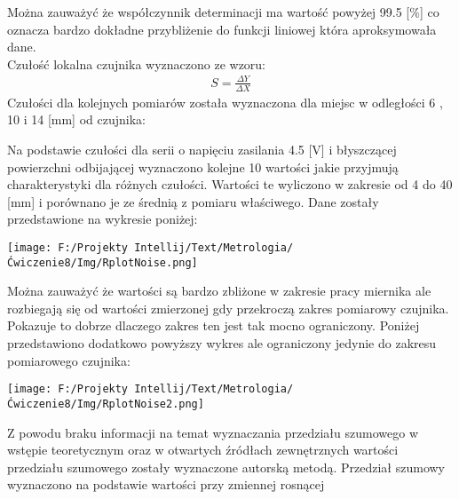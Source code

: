 \documentclass[11pt]{article}
\begin{document}
    \indent Można zauważyć że współczynnik determinacji ma wartość powyżej 99.5 [\%] co oznacza bardzo dokładne przybliżenie do funkcji
    liniowej która aproksymowała dane.\\
    \indent Czułość lokalna czujnika wyznaczono ze wzoru:
    \begin{gather*}
        S=\frac{\Delta Y}{\Delta X}
    \end{gather*}
    \indent Czułości dla kolejnych pomiarów została wyznaczona dla miejsc w odległości 6 , 10 i 14 [mm] od czujnika:
    \begin{center}
    \end{center}
    \par Na podstawie czułości dla serii o napięciu zasilania 4.5 [V] i błyszczącej powierzchni odbijającej wyznaczono kolejne 10 wartości jakie
    przyjmują charakterystyki dla różnych czułości. Wartości te wyliczono w zakresie od 4 do 40 [mm] i porównano je ze średnią z pomiaru właściwego.
    Dane zostały przedstawione na wykresie poniżej:
    \begin{center}
        \texttt{[image: F:/Projekty Intellij/Text/Metrologia/Ćwiczenie8/Img/RplotNoise.png]}
    \end{center}
    \par Można zauważyć że wartości są bardzo zbliżone w zakresie pracy miernika ale rozbiegają się od wartości zmierzonej gdy przekroczą zakres
    pomiarowy czujnika. Pokazuje to dobrze dlaczego zakres ten jest tak mocno ograniczony. Poniżej przedstawiono dodatkowo powyższy wykres
    ale ograniczony jedynie do zakresu pomiarowego czujnika:
    \begin{center}
        \texttt{[image: F:/Projekty Intellij/Text/Metrologia/Ćwiczenie8/Img/RplotNoise2.png]}
    \end{center}
    \par Z powodu braku informacji na temat wyznaczania przedziału szumowego w wstępie teoretycznym oraz w otwartych źródłach zewnętrznych
    wartości przedziału szumowego zostały wyznaczone autorską metodą. Przedział szumowy wyznaczono na podstawie wartości przy zmiennej rosnącej
\end{document}
